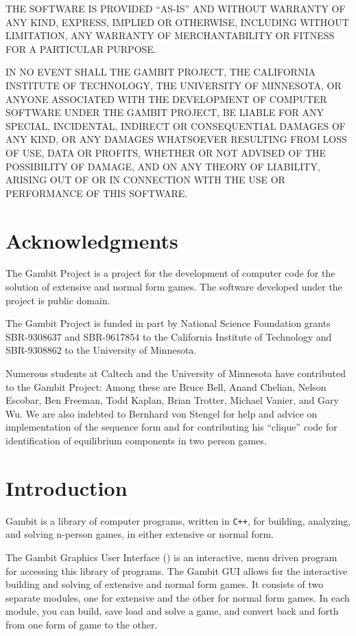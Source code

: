THE SOFTWARE IS PROVIDED ``AS-IS'' AND WITHOUT WARRANTY OF ANY KIND,
EXPRESS, IMPLIED OR OTHERWISE, INCLUDING WITHOUT LIMITATION, ANY
WARRANTY OF MERCHANTABILITY OR FITNESS FOR A PARTICULAR PURPOSE.
 
IN NO EVENT SHALL THE GAMBIT PROJECT, THE CALIFORNIA INSTITUTE OF
TECHNOLOGY, THE UNIVERSITY OF MINNESOTA, OR ANYONE ASSOCIATED WITH THE
DEVELOPMENT OF COMPUTER SOFTWARE UNDER THE GAMBIT PROJECT, BE LIABLE
FOR ANY SPECIAL, INCIDENTAL, INDIRECT OR CONSEQUENTIAL DAMAGES OF ANY
KIND, OR ANY DAMAGES WHATSOEVER RESULTING FROM LOSS OF USE, DATA OR
PROFITS, WHETHER OR NOT ADVISED OF THE POSSIBILITY OF DAMAGE, AND ON
ANY THEORY OF LIABILITY, ARISING OUT OF OR IN CONNECTION WITH THE USE
OR PERFORMANCE OF THIS SOFTWARE.


\chapter*{Acknowledgments}%

The Gambit Project is a project for the development of computer code
for the solution of extensive and normal form games.  The software
developed under the project is public domain.

The Gambit Project is funded in part by National Science Foundation
grants SBR-9308637 and SBR-9617854 to the California Institute of
Technology and SBR-9308862 to the University of Minnesota.

Numerous students at Caltech and the University of Minnesota have
contributed to the Gambit Project: Among these are Bruce Bell, Anand
Chelian, Nelson Escobar, Ben Freeman, Todd Kaplan, Brian Trotter,
Michael Vanier, and Gary Wu.  We are also indebted to Bernhard von
Stengel for help and advice on implementation of the sequence form and
for contributing his ``clique'' code for identification of equilibrium
components in two person games.  

\chapter{Introduction}

Gambit is a library of computer programs, written
in \verb$C++$, for building, analyzing, and solving n-person games, in
either extensive or normal form.

The Gambit Graphics User Interface () is an
interactive, menu driven program for accessing this library of programs.
The Gambit GUI allows for the interactive building and solving of
extensive and normal form games.  It consists of two separate modules, one
for extensive and the other for normal form games.   In each module, you
can build, save load and solve a game, and convert back and forth from one
form of game to the other.

